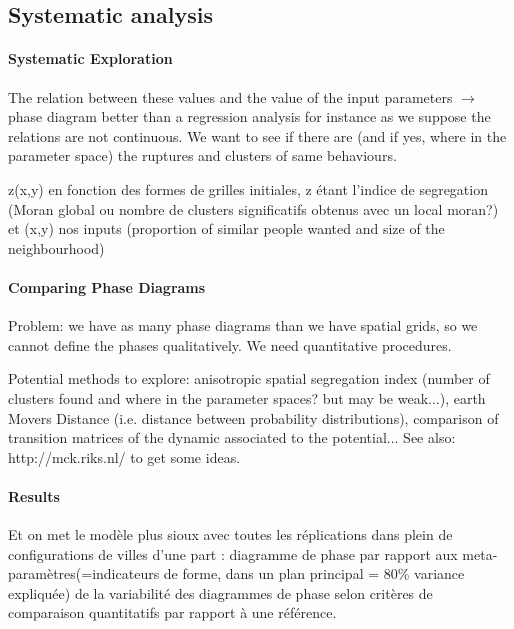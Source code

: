 \documentclass[a4paper,12pt]{article}
\begin{document}
\subsection{Systematic analysis}


\paragraph{Systematic Exploration}

The relation between these values and the value of the input parameters $\rightarrow$ phase diagram better than a regression analysis for instance as we suppose the relations are not continuous. We want to see if there are (and if yes, where in the parameter space) the ruptures and clusters of same behaviours.

z(x,y) en fonction des formes de grilles initiales, z étant l'indice de segregation (Moran global ou nombre de clusters significatifs obtenus avec un local moran?) et (x,y) nos inputs (proportion of similar people wanted and size of the neighbourhood) 



\paragraph{Comparing Phase Diagrams}

Problem: we have as many phase diagrams than we have spatial grids, so we cannot define the phases qualitatively. We need quantitative procedures.

Potential methods to explore: anisotropic spatial segregation index (number of clusters found and where in the parameter spaces? but may be weak...), earth Movers Distance (i.e. distance between probability distributions), comparison of transition matrices of the dynamic associated to the potential...
See also: http://mck.riks.nl/ to get some ideas.


\paragraph{Results}

Et on met le mod{\`e}le plus sioux avec toutes les réplications dans plein de configurations de villes d'une part : diagramme de phase par rapport aux meta-param{\`e}tres(=indicateurs de forme, dans un plan principal = 80\% variance expliqu{\'e}e) de la variabilit{\'e} des diagrammes de phase selon critères de comparaison quantitatifs par rapport à une r{\'e}f{\'e}rence.
\end{document}
